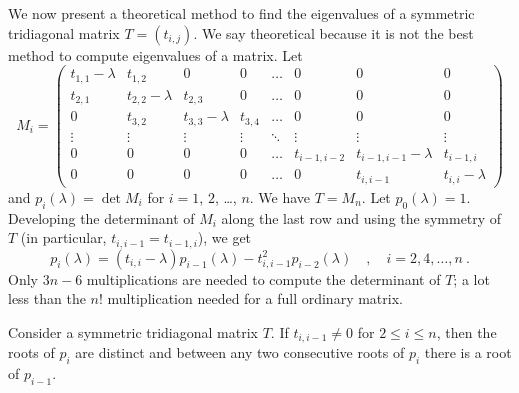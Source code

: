We now present a theoretical method to find the eigenvalues of a symmetric
tridiagonal \nn matrix $T = (t_{i,j})$.  We say theoretical because it
is not the best method to compute eigenvalues of a matrix.  Let
\[
M_i =
\begin{pmatrix}
t_{1,1}-\lambda & t_{1,2} & 0 & 0& \ldots & 0 & 0 & 0 \\
t_{2,1} & t_{2,2}-\lambda & t_{2,3} & 0 & \ldots & 0 & 0 & 0 \\
0 & t_{3,2} & t_{3,3} -\lambda & t_{3,4} &\ldots & 0 & 0 & 0 \\
\vdots & \vdots & \vdots & \vdots & \ddots & \vdots & \vdots & \vdots \\
0 & 0 & 0 & 0 & \ldots & t_{i-1,i-2} & t_{i-1,i-1} - \lambda & t_{i-1,i} \\
0 & 0 & 0 & 0 & \ldots & 0 & t_{i,i-1} & t_{i,i} - \lambda
\end{pmatrix}
\]
and $p_i(\lambda) = \det M_i$ for $i=1$, $2$, \ldots, $n$.  We have $T=M_n$.
Let $p_0(\lambda) = 1$.  Developing the determinant of $M_i$ along the last
row and using the symmetry of $T$ (in particular, $t_{i,i-1} = t_{i-1,i}$),
we get
\begin{equation}\label{C14L23}
p_i(\lambda) = (t_{i,i}-\lambda) p_{i-1}(\lambda)
- t_{i,i-1}^2 p_{i-2}(\lambda) \quad , \quad i=2,4,\ldots, n \  .
\end{equation}
Only $3n-6$ multiplications are needed to compute the determinant of $T$; a
lot less than the $n!$ multiplication needed for a full ordinary \nn matrix.

\begin{theorem}
Consider a symmetric tridiagonal matrix $T$.  If $t_{i,i-1} \neq 0$ for
$2\leq i \leq n$, then the roots of $p_i$ are distinct and between
any two consecutive roots of $p_i$ there is a root of $p_{i-1}$.
\end{theorem}


